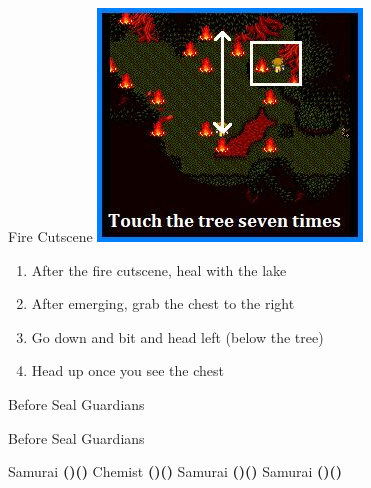 \begin{paracol}{2}
\switchcolumn
\begin{steproute}{Fire Cutscene}
    \includegraphics[scale=0.449]{../Graphics/Steps/152. Forest of Moore 4.jpg}
\end{steproute}

\switchcolumn*
\begin{enumerate}[resume]
    \item After the fire cutscene, heal with the lake
    \item After emerging, grab the  chest to the right
    \item Go down and bit and head left (below the tree)
    \item Head up once you see the chest
\end{enumerate}

\switchcolumn
\begin{steproute}{Before Seal Guardians}
\end{steproute}

\switchcolumn
\begin{menu}{Before Seal Guardians}
    \varwb
    \begin{jobMenu}
        \lenna Samurai \textbf{(\pointLeft)(\pointDown)} \optimize
        \bartz Chemist \textbf{(\pointUp)(\pointRight)} \ability{!\gilToss} \optimize
        \faris Samurai \textbf{(\pointLeft)(\pointDown)} \equip{\goldShield}
        \galuf Samurai \textbf{(\pointLeft)(\pointDown)} \optimize
    \end{jobMenu}
    \begin{itemMenu}
        \hiPotionMenu {}
    \end{itemMenu}
    \varwe
\end{menu}


\end{paracol}
